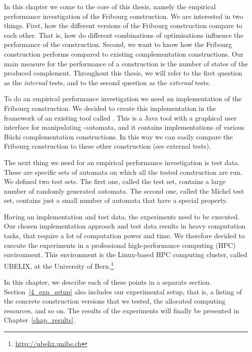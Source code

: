 In this chapter we come to the core of this thesis, namely the empirical performance investigation of the Fribourg construction. We are interested in two things. First, how the different versions of the Fribourg construction compare to each other. That is, how do different combinations of optimisations influence the performance of the construction. Second, we want to know how the Fribourg construction performs compared to existing complementation constructions. Our main measure for the performance of a construction is the number of states of the produced complement. Throughout this thesis, we will refer to the first question as the \textit{internal} tests, and to the second question as the \textit{external} tests.

To do an empirical performance investigation we need an implementation of the Fribourg construction. We decided to create this implementation in the framework of an existing tool called \goal. This is a Java tool with a graphical user interface for manipulating \om-automata, and it contains implementations of various Büchi complementation constructions. In this way we can easily compare the Fribourg construction to these other construction (see external tests).

The next thing we need for an empirical performance investigation is test data. These are specific sets of automata on which all the tested construction are run. We defined two test sets. The first one, called the \goal{} test set, contains a large number of randomly generated automata. The second one, called the Michel test set, contains just a small number of automata that have a special property.

Having an implementation and test data, the experiments need to be executed. Our chosen implementation approach and test data results in heavy computation tasks, that require a lot of computation power and time. We therefore decided to execute the experiments in a professional high-performance computing (HPC) environment. This environment is the Linux-based HPC computing cluster, called UBELIX, at the University of Bern.\footnote{\url{http://ubelix.unibe.ch}}

In this chapter, we describe each of these points in a separate section. Section~\ref{4_exp_setup} also includes our experimental setup, that is, a listing of the concrete construction versions that we tested, the allocated computing resources, and so on. The results of the experiments will finally be presented in Chapter~\ref{chap_results}.


